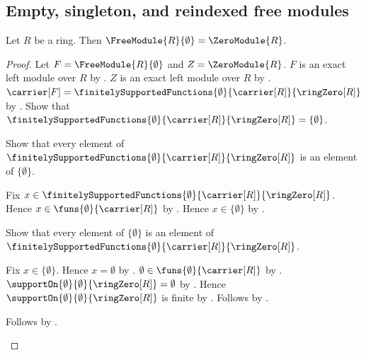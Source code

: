 \subsection{Empty, singleton, and reindexed free modules}

\begin{theorem}\label{empty_free_module_eq_zero_module}
    Let $R$ be a ring.
    Then $\FreeModule{R}{\emptyset}=\ZeroModule{R}$.
\end{theorem}
\begin{proof}
    Let $F=\FreeModule{R}{\emptyset}$ and $Z=\ZeroModule{R}$.
    $F$ is an exact left module over $R$ by
        .
    $Z$ is an exact left module over $R$ by
        .
    $\carrier[F]
        =\finitelySupportedFunctions{\emptyset}{\carrier[R]}{
            \ringZero[R]}$ by .
    Show that
        $\finitelySupportedFunctions{\emptyset}{\carrier[R]}{
            \ringZero[R]}=\{\emptyset\}$.
    \begin{subproof}
        Show that every element of
            $\finitelySupportedFunctions{\emptyset}{\carrier[R]}{
                \ringZero[R]}$ is an element of $\{\emptyset\}$.
        \begin{subproof}
            Fix $x\in\finitelySupportedFunctions{\emptyset}{
                \carrier[R]}{\ringZero[R]}$.
            Hence $x\in\funs{\emptyset}{\carrier[R]}$ by
                .
            Hence $x\in\{\emptyset\}$ by
                .
        \end{subproof}
        Show that every element of $\{\emptyset\}$ is an element of
            $\finitelySupportedFunctions{\emptyset}{\carrier[R]}{
                \ringZero[R]}$.
        \begin{subproof}
            Fix $x\in\{\emptyset\}$.
            Hence $x=\emptyset$ by .
            $\emptyset\in\funs{\emptyset}{\carrier[R]}$ by
                .
            $\supportOn{\emptyset}{\emptyset}{\ringZero[R]}
                =\emptyset$ by .
            Hence $\supportOn{\emptyset}{\emptyset}{\ringZero[R]}$
                is finite by .
            Follows by
                .
        \end{subproof}
        Follows by .
    \end{subproof}

\end{proof}
